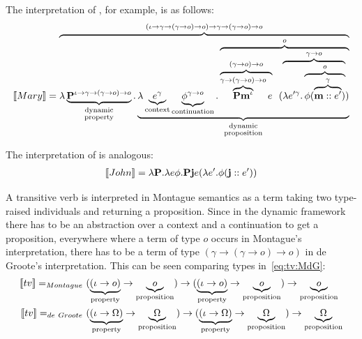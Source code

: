 The interpretation of , for example, is as follows: 
\begin{align}
\I{Mary} =  \overbrace{\lambda \underbrace{{\P2}^{\iota \rightarrow \gamma \rightarrow (\gamma \rightarrow o) \rightarrow o}}_{\begin{smallmatrix}
\text{dynamic}\\
\text{property}
\end{smallmatrix}}. \underbrace{\lambda \underbrace{{e}^{\gamma}}_{\text{context}} \underbrace{{\phi}^{\gamma \rightarrow o}}_{\text{continuation}}. \overbrace{\overbrace{\overbrace{\P2 {\textbf{m}}^{\iota}}^{\gamma \rightarrow (\gamma \rightarrow o) \rightarrow o} e}^{(\gamma \rightarrow o) \rightarrow o} \ \ (\overbrace{\lambda e'^{\gamma}. \overbrace{\phi ( \overbrace{\upii{\textbf{m}}{e'}}^{\gamma})}^{o}}^{\gamma \rightarrow o})}^{o}}_{
\begin{smallmatrix}
\text{dynamic}\\
\text{proposition}
\end{smallmatrix}}}^{(\iota \rightarrow \gamma \rightarrow (\gamma \rightarrow o) \rightarrow o) \rightarrow \gamma \rightarrow (\gamma \rightarrow o) \rightarrow o}\label{eq:dG:Mary}
\end{align}

The interpretation of  is analogous:
\begin{align}
\I{John} = \lambda \P2. \lambda e \phi. \P2 \textbf{j} e (\lambda e' .\phi (\textbf{j}::{e'})) \label{eq:dG:John}
\end{align}

A transitive verb is interpreted in Montague semantics as a term taking two type-raised individuals and returning a proposition.  Since in the dynamic framework there has to be an abstraction over a context and a continuation to get a proposition,  everywhere where a term of type $o$ occurs in Montague's interpretation, there has to be a term of type $(\gamma \rightarrow (\gamma \rightarrow o) \rightarrow o)$ in de Groote's interpretation. This can be seen comparing types in~\eqref{eq:tv:MdG}:
\begin{subequations}
\begin{align}
\I{tv} =_{Montague} \ & (\underbrace{(\iota \rightarrow   o)}_{\text{property}} \rightarrow \underbrace{o}_{\text{proposition}}) \rightarrow (\underbrace{(\iota \rightarrow   o)}_{\text{property}} \rightarrow \underbrace{o}_{\text{proposition}})  \rightarrow \underbrace{o}_{\text{proposition}} \\
\I{tv} =_{de~Groote} \ &  (\underbrace{(\iota \rightarrow   \Omega)}_{\text{property}} \rightarrow \underbrace{\Omega}_{\text{proposition}}) \rightarrow (\underbrace{(\iota \rightarrow   \Omega)}_{\text{property}} \rightarrow \underbrace{\Omega}_{\text{proposition}})  \rightarrow \underbrace{\Omega}_{\text{proposition}} 
\end{align} \label{eq:tv:MdG}
\end{subequations}


